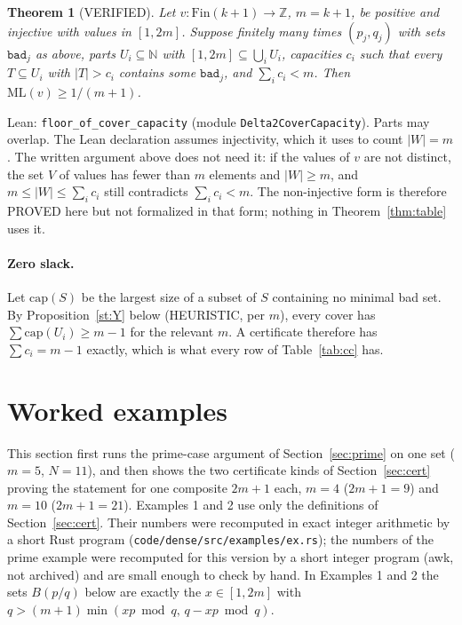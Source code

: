 \documentclass[11pt]{article}
\newtheorem{theorem}{Theorem}
\theoremstyle{remark}
\newcommand{\ML}{\mathrm{ML}}
\newcommand{\Z}{\mathbb{Z}}
\begin{document}
\begin{theorem}[VERIFIED]\label{thm:cc}
Let $v:\mathrm{Fin}(k+1)\to\Z$, $m=k+1$, be positive and injective with values in $[1,2m]$. Suppose finitely many times $(p_j,q_j)$ with sets $\mathtt{bad}_j$ as above, parts $U_i\subseteq\mathbb N$ with $[1,2m]\subseteq\bigcup_iU_i$, capacities $c_i$ such that every $T\subseteq U_i$ with $|T|>c_i$ contains some $\mathtt{bad}_j$, and $\sum_ic_i<m$. Then $\ML(v)\ge1/(m+1)$.
\end{theorem}
\noindent Lean: \texttt{floor\_of\_cover\_capacity} (module \texttt{Delta2CoverCapacity}). Parts may overlap. The Lean declaration assumes injectivity, which it uses to count $|W|=m$. The written argument above does not need it: if the values of $v$ are not distinct, the set $V$ of values has fewer than $m$ elements and $|W|\ge m$, and $m\le|W|\le\sum_ic_i$ still contradicts $\sum_ic_i<m$. The non-injective form is therefore PROVED here but not formalized in that form; nothing in Theorem~\ref{thm:table} uses it.

\paragraph{Zero slack.} Let $\mathrm{cap}(S)$ be the largest size of a subset of $S$ containing no minimal bad set. By Proposition~\ref{st:Y} below (HEURISTIC, per $m$), every cover has $\sum\mathrm{cap}(U_i)\ge m-1$ for the relevant $m$. A certificate therefore has $\sum c_i=m-1$ exactly, which is what every row of Table~\ref{tab:cc} has.

\section{Worked examples}\label{sec:examples}

This section first runs the prime-case argument of Section~\ref{sec:prime} on one set ($m=5$, $N=11$), and then shows the two certificate kinds of Section~\ref{sec:cert} proving the statement for one composite $2m+1$ each, $m=4$ ($2m+1=9$) and $m=10$ ($2m+1=21$). Examples 1 and 2 use only the definitions of Section~\ref{sec:cert}. Their numbers were recomputed in exact integer arithmetic by a short Rust program (\texttt{code/dense/src/examples/ex.rs}); the numbers of the prime example were recomputed for this version by a short integer program (awk, not archived) and are small enough to check by hand. In Examples 1 and 2 the sets $B(p/q)$ below are exactly the $x\in[1,2m]$ with $q>(m+1)\min(xp\bmod q,\,q-xp\bmod q)$.
\end{document}
